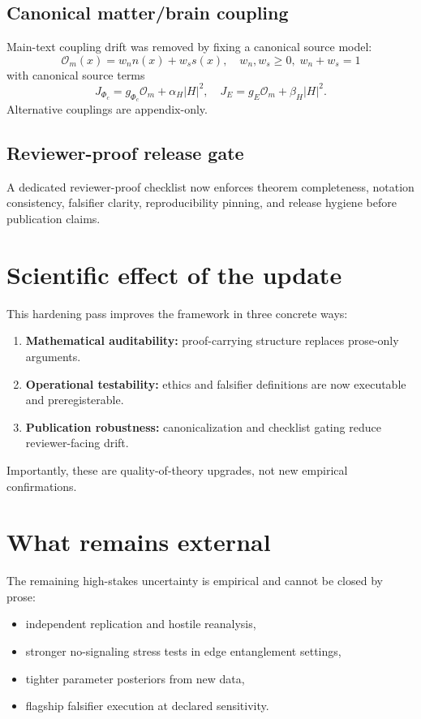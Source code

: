 \documentclass[11pt]{article}
\begin{document}
\subsection{Canonical matter/brain coupling}
Main-text coupling drift was removed by fixing a canonical source model:
\begin{equation}
\mathcal{O}_m(x)=w_n n(x)+w_s s(x), \quad w_n,w_s\ge 0,\; w_n+w_s=1
\end{equation}
with canonical source terms
\begin{equation}
J_{\Phi_c}=g_{\Phi_c}\mathcal{O}_m+\alpha_H|H|^2, \quad
J_E=g_E\mathcal{O}_m+\beta_H|H|^2.
\end{equation}
Alternative couplings are appendix-only.

\subsection{Reviewer-proof release gate}
A dedicated reviewer-proof checklist now enforces theorem completeness, notation consistency, falsifier clarity,
reproducibility pinning, and release hygiene before publication claims.

\section{Scientific effect of the update}
This hardening pass improves the framework in three concrete ways:
\begin{enumerate}
\item \textbf{Mathematical auditability:} proof-carrying structure replaces prose-only arguments.
\item \textbf{Operational testability:} ethics and falsifier definitions are now executable and preregisterable.
\item \textbf{Publication robustness:} canonicalization and checklist gating reduce reviewer-facing drift.
\end{enumerate}
Importantly, these are quality-of-theory upgrades, not new empirical confirmations.

\section{What remains external}
The remaining high-stakes uncertainty is empirical and cannot be closed by prose:
\begin{itemize}
\item independent replication and hostile reanalysis,
\item stronger no-signaling stress tests in edge entanglement settings,
\item tighter parameter posteriors from new data,
\item flagship falsifier execution at declared sensitivity.
\end{itemize}
\end{document}
